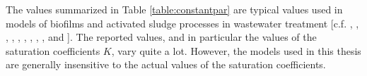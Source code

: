 The values summarized in Table \ref{table:constantpar} are typical values used in models of biofilms and activated sludge processes in wastewater treatment [c.f. , , , , , , , , , and ]. The reported values, and in particular the values of the saturation coefficients $K$, vary quite a lot. However, the models used in this thesis are generally insensitive to the actual values of the saturation coefficients. 